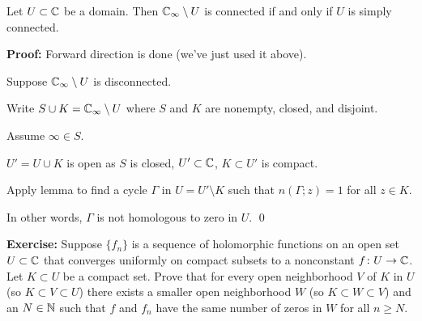 \documentclass[10pt,aspectratio=169]{beamer}
\begin{document}
\begin{frame}
\begin{theorem}
Let $U \subset {\mathbb{C}}$ be a domain.  Then
${\mathbb{C}}_\infty \setminus U$ is connected if and only if $U$ is simply connected.
\end{theorem}

\pause

\textbf{Proof:}
Forward direction is done (we've just used it above).

\medskip
\pause

Suppose ${\mathbb{C}}_\infty \setminus U$ is disconnected.

\medskip
\pause

Write $S \cup K = {\mathbb{C}}_\infty \setminus U$ where
$S$ and $K$ are nonempty, closed, and disjoint.

\medskip
\pause
Assume $\infty \in S$.

\medskip
\pause
$U' = U \cup K$ is open as $S$ is closed,
\quad
\pause
$U' \subset {\mathbb{C}}$,
\quad
\pause
$K \subset U'$ is compact.

\medskip
\pause

Apply lemma to find a cycle
$\Gamma$ in $U = U' \setminus K$ such that $n(\Gamma;z) = 1$ for all $z \in
K$.

\medskip
\pause

In other words, $\Gamma$ is not homologous to zero in $U$. \qed
\end{frame}

\begin{frame}
\textbf{Exercise:}
Suppose $\{ f_n \}$ is a sequence of holomorphic functions on an open set
$U \subset {\mathbb{C}}$ that converges uniformly on compact subsets to
a nonconstant
$f \colon U \to {\mathbb{C}}$.  Let $K \subset U$ be a compact set.  Prove that
for every open neighborhood $V$ of $K$ in $U$ (so $K \subset V \subset U$) there exists
a smaller open neighborhood $W$ (so $K \subset W \subset V$) and an $N \in {\mathbb{N}}$
such that $f$ and $f_n$ have the same number of zeros in $W$ for all
$n \geq N$.

\end{frame}
\end{document}
